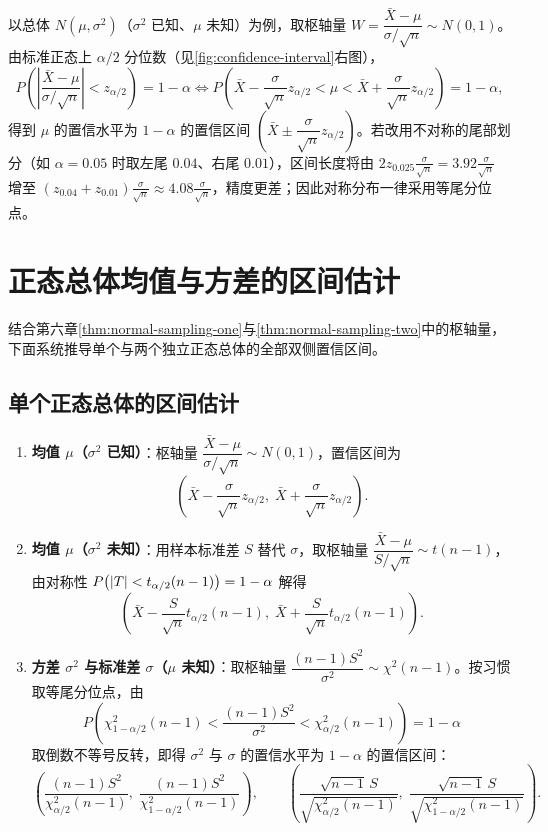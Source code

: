 以总体 $N(\mu,\sigma^2)$（$\sigma^2$ 已知、$\mu$ 未知）为例，取枢轴量 $W=\dfrac{\bar{X}-\mu}{\sigma/\sqrt{n}}\sim N(0,1)$。由标准正态上 $\alpha/2$ 分位数（见\cref{fig:confidence-interval}右图），
\[
  P\!\left(\left|\frac{\bar{X}-\mu}{\sigma/\sqrt{n}}\right|<z_{\alpha/2}\right)=1-\alpha
  \iff P\!\left(\bar{X}-\frac{\sigma}{\sqrt{n}}z_{\alpha/2}<\mu<\bar{X}+\frac{\sigma}{\sqrt{n}}z_{\alpha/2}\right)=1-\alpha,
\]
得到 $\mu$ 的置信水平为 $1-\alpha$ 的置信区间 $\left(\bar{X}\pm\dfrac{\sigma}{\sqrt{n}}z_{\alpha/2}\right)$。若改用不对称的尾部划分（如 $\alpha=0.05$ 时取左尾 $0.04$、右尾 $0.01$），区间长度将由 $2z_{0.025}\frac{\sigma}{\sqrt{n}}=3.92\frac{\sigma}{\sqrt{n}}$ 增至 $(z_{0.04}+z_{0.01})\frac{\sigma}{\sqrt{n}}\approx 4.08\frac{\sigma}{\sqrt{n}}$，精度更差；因此对称分布一律采用等尾分位点。

\section{正态总体均值与方差的区间估计}
\label{sec:normal-ci}

结合第六章\cref{thm:normal-sampling-one}与\cref{thm:normal-sampling-two}中的枢轴量，下面系统推导单个与两个独立正态总体的全部双侧置信区间。

\subsection{单个正态总体的区间估计}

\begin{enumerate}
  \item \textbf{均值 $\mu$（$\sigma^2$ 已知）}：枢轴量 $\dfrac{\bar{X}-\mu}{\sigma/\sqrt{n}}\sim N(0,1)$，置信区间为
  \begin{equation}
    \left(\bar{X}-\frac{\sigma}{\sqrt{n}}z_{\alpha/2},\;\bar{X}+\frac{\sigma}{\sqrt{n}}z_{\alpha/2}\right).
    \label{eq:ci-mu-known}
  \end{equation}
  \item \textbf{均值 $\mu$（$\sigma^2$ 未知）}：用样本标准差 $S$ 替代 $\sigma$，取枢轴量 $\dfrac{\bar{X}-\mu}{S/\sqrt{n}}\sim t(n-1)$，由对称性 $P\bigl(\lvert T\rvert<t_{\alpha/2}(n-1)\bigr)=1-\alpha$ 解得
  \begin{equation}
    \left(\bar{X}-\frac{S}{\sqrt{n}}t_{\alpha/2}(n-1),\;\bar{X}+\frac{S}{\sqrt{n}}t_{\alpha/2}(n-1)\right).
    \label{eq:ci-mu-unknown}
  \end{equation}
  \item \textbf{方差 $\sigma^2$ 与标准差 $\sigma$（$\mu$ 未知）}：取枢轴量 $\dfrac{(n-1)S^2}{\sigma^2}\sim\chi^2(n-1)$。按习惯取等尾分位点，由
  \[
    P\!\left(\chi_{1-\alpha/2}^2(n-1)<\frac{(n-1)S^2}{\sigma^2}<\chi_{\alpha/2}^2(n-1)\right)=1-\alpha
  \]
  取倒数不等号反转，即得 $\sigma^2$ 与 $\sigma$ 的置信水平为 $1-\alpha$ 的置信区间：
  \begin{equation}
    \left(\frac{(n-1)S^2}{\chi_{\alpha/2}^2(n-1)},\;\frac{(n-1)S^2}{\chi_{1-\alpha/2}^2(n-1)}\right),
    \qquad
    \left(\frac{\sqrt{n-1}\,S}{\sqrt{\chi_{\alpha/2}^2(n-1)}},\;\frac{\sqrt{n-1}\,S}{\sqrt{\chi_{1-\alpha/2}^2(n-1)}}\right).
    \label{eq:ci-sigma2}
  \end{equation}
\end{enumerate}

